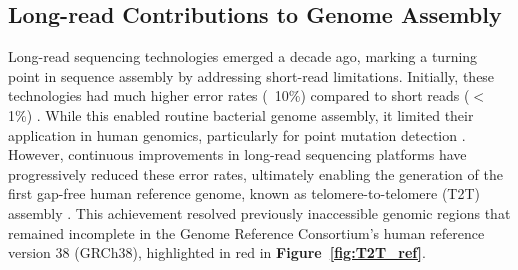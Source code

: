 \subsection{Long-read Contributions to Genome Assembly}

Long-read sequencing technologies emerged a decade ago, marking a turning point 
in sequence assembly by addressing short-read limitations. Initially, these 
technologies had much higher error rates (~10\%) compared to short reads ($<$ 1\%)
\cite{espinosa_advancements_2024}. While this enabled routine bacterial genome 
assembly, it limited their application in human genomics, particularly for point 
mutation detection \cite{loman_complete_2015}. However, continuous improvements 
in long-read sequencing platforms have progressively reduced these error rates, 
ultimately enabling the generation of the first gap-free human reference genome, 
known as telomere-to-telomere (T2T) assembly \cite{nurk_complete_2022}. 
This achievement resolved previously inaccessible genomic regions that remained 
incomplete in the Genome Reference Consortium's human reference version 38 
(GRCh38), highlighted in red in \textbf{Figure~\ref{fig:T2T_ref}}.


